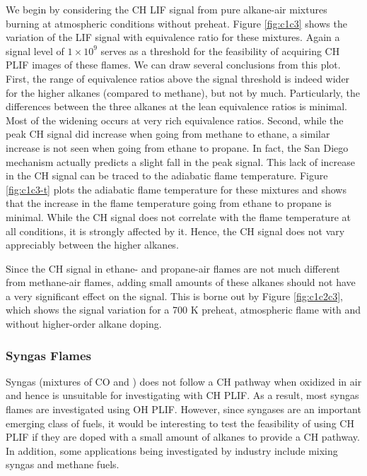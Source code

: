 We begin by considering the CH LIF signal from pure alkane-air mixtures burning at atmospheric conditions without preheat.
Figure \ref{fig:c1c3} shows the variation of the LIF signal with equivalence ratio for these mixtures.
Again a signal level of \(1\times10^9\) serves as a threshold for the feasibility of acquiring CH PLIF images of these flames.
We can draw several conclusions from this plot.
First, the range of equivalence ratios above the signal threshold is indeed wider for the higher alkanes (compared to methane), but not by much.
Particularly, the differences between the three alkanes at the lean equivalence ratios is minimal.
Most of the widening occurs at very rich equivalence ratios.
Second, while the peak CH signal did increase when going from methane to ethane, a similar increase is not seen when going from ethane to propane.
In fact, the San Diego mechanism actually predicts a slight fall in the peak signal.
This lack of increase in the CH signal can be traced to the adiabatic flame temperature.
Figure \ref{fig:c1c3-t} plots the adiabatic flame temperature for these mixtures and shows that the increase in the flame temperature going from ethane to propane is minimal.
While the CH signal does not correlate with the flame temperature at all conditions, it is strongly affected by it.
Hence, the CH signal does not vary appreciably between the higher alkanes.




Since the CH signal in ethane- and propane-air flames are not much different from methane-air flames, adding small amounts of these alkanes should not have a very significant effect on the signal.
This is borne out by Figure \ref{fig:c1c2c3}, which shows the signal variation for a 700 K preheat, atmospheric flame with and without higher-order alkane doping.



\subsubsection{Syngas Flames}

Syngas (mixtures of CO and ) does not follow a CH pathway when oxidized in air and hence is unsuitable for investigating with CH PLIF.
As a result, most syngas flames are investigated using OH PLIF.
However, since syngases are an important emerging class of fuels, it would be interesting to test the feasibility of using CH PLIF if they are doped with a small amount of alkanes to provide a CH pathway. In addition, some applications being investigated by industry include mixing syngas and methane fuels.

